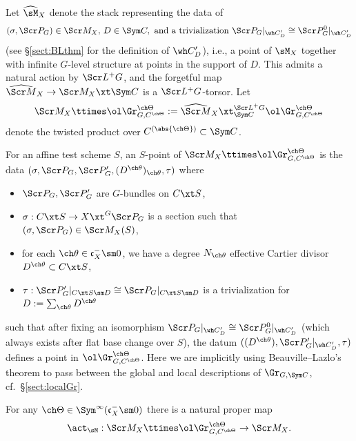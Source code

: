 \subsubsection{}  \label{sect:Glevel}
Let $\widehat\sM_X$ denote the stack
representing the data of
\[ (\sigma,\Scr P_G)\in \Scr M_X,\, D\in \Sym C,
\text{ and a trivialization }\Scr P_G|_{\wh C'_D} \cong \Scr P^0_G|_{\wh C'_D}
\]
(see \S\ref{sect:BLthm} for the definition of $\wh C'_D$), i.e.,
a point of $\sM_X$ together with infinite $G$-level structure at points in the support of $D$.
This admits a natural action by $\Scr L^+ G$, and
the forgetful map $\widehat{\Scr M}_X
 \to \Scr M_X \xt \Sym C$ is a $\Scr L^+G$-torsor.
Let
\[ \Scr M_X \ttimes \ol\Gr^{\ch\Theta}_{G, C^{\ch\Theta}} :=
\widehat{\Scr M}_X \xt^{\Scr L^+ G}_{\Sym C}
\ol\Gr^{\ch\Theta}_{G,C^{\ch\Theta}} \]
denote the twisted product over $C^{(\abs{\ch\Theta})} \subset \Sym C$.

For an affine test scheme $S$,
an $S$-point of $\Scr M_X \ttimes \ol\Gr^{\ch\Theta}_{G,C^{\ch\Theta}}$
is the data
$(\sigma, \Scr P_G,\Scr P'_G, (D^{\ch\theta})_{\ch\theta}, \tau)$
where
\begin{itemize}
\item $\Scr P_G,\Scr P_G'$ are $G$-bundles on $C\xt S$,
\item $\sigma : C\xt S \to X\xt^G \Scr P_G$ is a section such that $(\sigma,\Scr P_G)\in \Scr M_X(S)$,
\item for each $\ch\theta \in \mathfrak c_X^- \sm 0$,
we have a degree $N_{\ch\theta}$ effective Cartier divisor
$D^{\ch\theta} \subset C\xt S$,
\item $\tau : \Scr P'_G|_{C\xt S\sm D} \cong \Scr P_G|_{C\xt S\sm D}$
is a trivialization for $D:=\sum_{\ch\theta} D^{\ch\theta}$
\end{itemize}
such that after fixing an isomorphism
$\Scr P_G|_{\wh C'_D} \cong \Scr P^0_G|_{\wh C'_D}$ (which always exists
after flat base change over $S$), the datum
$((D^{\ch\theta}),\Scr P'_G|_{\wh C'_D},\tau)$ defines
a point in $\ol\Gr^{\ch\Theta}_{G,C^{\ch\Theta}}$.
Here we are implicitly using Beauville--Lazlo's theorem to pass between
the global and local descriptions of $\Gr_{G,\Sym C}$,
cf.~\S\ref{sect:localGr}.


\begin{prop-const}
\label{prop-const:action}
For any $\ch\Theta \in \Sym^\infty(\mathfrak c_X^-\sm 0)$
there is a natural proper map
\[ \act_\sM : \Scr M_X \ttimes \ol\Gr^{\ch\Theta}_{G, C^{\ch\Theta}} \to
\Scr M_X. \]
\end{prop-const}

